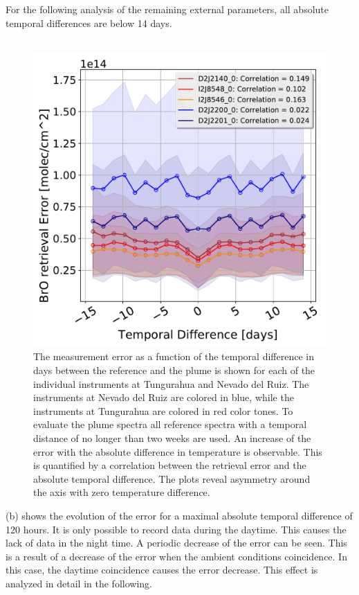 For the following analysis of the remaining external parameters, all absolute temporal differences are below 14 days.\\
\\
\begin{figure}[h!]
    \centering
    \includegraphics[width=0.7\linewidth]{Bilder/DatallInstruments}
    \caption[The  measurement error as a function of the temporal difference in days between the reference and the plume is shown for each of the individual instruments at Tungurahua and Nevado del Ruiz. ]{The  measurement error as a function of the temporal difference in days between the reference and the plume is shown for each of the individual instruments at Tungurahua and Nevado del Ruiz. The instruments at Nevado del Ruiz are colored in blue, while the instruments at Tungurahua are colored in red color tones.  To evaluate the plume spectra all reference spectra with a temporal distance of no longer than two weeks are used. An increase of the  error with the absolute difference in temperature is observable. This is quantified by a correlation between the  retrieval error and the absolute temporal difference. The plots reveal  asymmetry around the axis with zero temperature difference.}
    \label{fig:datallinstruments}
\end{figure}
%
 (b) shows the evolution of the  error for a maximal absolute temporal difference of 120 hours. It is only possible to record data during the daytime. This causes the lack of data in the night time. A periodic decrease of the  error can be seen. This is a result of a decrease of the  error when the ambient conditions coincidence. In this case, the daytime coincidence causes the   error decrease. This effect is analyzed in detail in the following.


